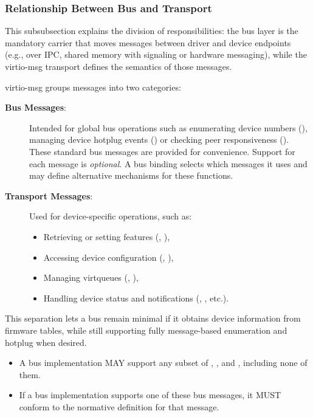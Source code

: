 \subsubsection{Relationship Between Bus and Transport}
\label{sec:Virtio Transport Options / Virtio Over Messages / Basic Concepts / Relationship between bus and transport}

This subsubsection explains the division of responsibilities: the bus layer is
the mandatory carrier that moves messages between driver and device endpoints
(e.g., over IPC, shared memory with signaling or hardware messaging), while
the virtio-msg transport defines the semantics of those messages.

virtio-msg groups messages into two categories:

\begin{description}
  \item[\textbf{Bus Messages}:]
    Intended for global bus operations such as enumerating device numbers
    (), managing device hotplug events ()
    or checking peer responsiveness ().
    These standard bus messages are provided for convenience. Support for
    each message is \emph{optional}. A bus binding selects which messages it
    uses and may define alternative mechanisms for these functions.

  \item[\textbf{Transport Messages}:]
    Used for device-specific operations, such as:
    \begin{itemize}
      \item Retrieving or setting features (,
        ),
      \item Accessing device configuration (,
        ),
      \item Managing virtqueues (, ),
      \item Handling device status and notifications (,
        , etc.).
    \end{itemize}
\end{description}

This separation lets a bus remain minimal if it obtains device information from
firmware tables, while still supporting fully message-based enumeration and
hotplug when desired.

\begin{itemize}
  \item A bus implementation MAY support any subset of ,
        , and , including none of them.
  \item If a bus implementation supports one of these bus messages, it MUST
        conform to the normative definition for that message.
\end{itemize}

